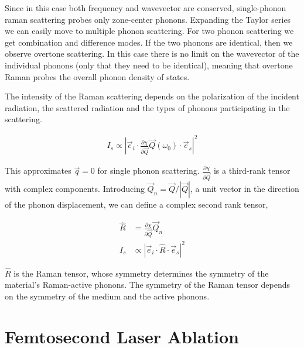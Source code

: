     Since in this case both frequency and wavevector are conserved, single-phonon raman scattering probes only zone-center phonons.
    Expanding the Taylor series we can easily move to multiple phonon scattering. For two phonon scattering we get combination
    and difference modes. If the two phonons are identical, then we observe overtone scattering. In this case there is no limit
    on the wavevector of the individual phonons (only that they need to be identical), meaning that overtone Raman probes the
    overall phonon density of states.

    The intensity of the Raman scattering depends on the polarization of the incident radiation, the scattered radiation and the
    types of phonons participating in the scattering.

    \begin{align}
        I_s \propto | \vec{e}_i \cdot \frac{\partial\chi}{\partial\vec{Q}}\vec{Q}(\omega_0)\cdot\vec{e}_s|^2
    \end{align}

    This approximates $\vec{q} = 0$ for single phonon scattering. $\frac{\partial\chi}{\partial\vec{Q}}$ is a third-rank tensor with
    complex components. Introducing $\vec{Q}_n = \vec{Q}/|\vec{Q}|$, a unit vector in the direction of the phonon displacement, we can
    define a complex second rank tensor,

    \begin{align}
        \hat{R} &= \frac{\partial\chi}{\partial\vec{Q}}\vec{Q}_n \\
        I_s &\propto | \vec{e}_i \cdot \hat{R} \cdot\vec{e}_s|^2
    \end{align}

    $\hat{R}$ is the Raman tensor, whose symmetry determines the symmetry of the material's Raman-active phonons. The symmetry of the
    Raman tensor depends on the symmetry of the medium and the active phonons.

\clearpage

\section{Femtosecond Laser Ablation}
\label{ap:Ablation}

